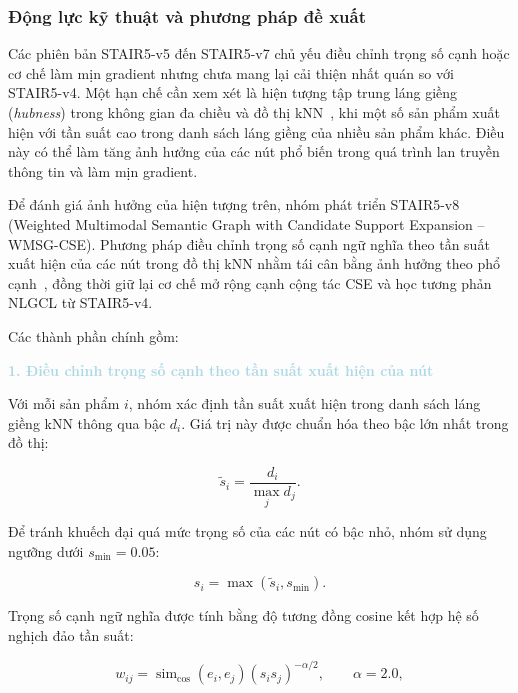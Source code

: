 \subsubsection{Động lực kỹ thuật và phương pháp đề xuất}

Các phiên bản STAIR5-v5 đến STAIR5-v7 chủ yếu điều chỉnh trọng số cạnh hoặc cơ chế làm mịn gradient nhưng chưa mang lại cải thiện nhất quán so với STAIR5-v4. Một hạn chế cần xem xét là hiện tượng tập trung láng giềng (\textit{hubness}) trong không gian đa chiều và đồ thị kNN~\cite{radovanovic2010hubs}, khi một số sản phẩm xuất hiện với tần suất cao trong danh sách láng giềng của nhiều sản phẩm khác. Điều này có thể làm tăng ảnh hưởng của các nút phổ biến trong quá trình lan truyền thông tin và làm mịn gradient.


Để đánh giá ảnh hưởng của hiện tượng trên, nhóm phát triển STAIR5-v8 (Weighted Multimodal Semantic Graph with Candidate Support Expansion -- WMSG-CSE). Phương pháp điều chỉnh trọng số cạnh ngữ nghĩa theo tần suất xuất hiện của các nút trong đồ thị kNN nhằm tái cân bằng ảnh hưởng theo phổ cạnh~\cite{sakurai2026edge,pahng2025improving}, đồng thời giữ lại cơ chế mở rộng cạnh cộng tác CSE và học tương phản NLGCL từ STAIR5-v4.


Các thành phần chính gồm:

\noindent\textcolor{lightblue}{\textbf{1. Điều chỉnh trọng số cạnh theo tần suất xuất hiện của nút}}

Với mỗi sản phẩm $i$, nhóm xác định tần suất xuất hiện trong danh sách láng giềng kNN thông qua bậc $d_i$. Giá trị này được chuẩn hóa theo bậc lớn nhất trong đồ thị:

\begin{equation}
\widetilde{s}_i=\frac{d_i}{\max_j d_j}.
\end{equation}

Để tránh khuếch đại quá mức trọng số của các nút có bậc nhỏ, nhóm sử dụng ngưỡng dưới $s_{\min}=0.05$:

\begin{equation}
s_i=\max(\widetilde{s}_i,s_{\min}).
\end{equation}

Trọng số cạnh ngữ nghĩa được tính bằng độ tương đồng cosine kết hợp hệ số nghịch đảo tần suất:

\begin{equation}
w_{ij}
=
\operatorname{sim}_{\cos}(e_i,e_j)
(s_i s_j)^{-\alpha/2},
\qquad \alpha=2.0,
\end{equation}

